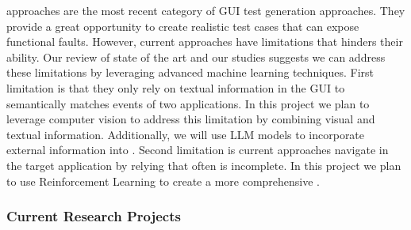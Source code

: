 
\bigskip
\testreuse approaches are the most recent category of GUI test generation approaches. 
They provide a great opportunity to create realistic test cases that can expose functional faults.
However, current approaches have limitations that hinders their ability. 
Our review of state of the art and our studies suggests we can address these limitations by leveraging advanced machine learning techniques.
First limitation is that they only rely on textual information in the GUI to semantically matches events of two applications. 
In this project we plan to leverage computer vision to address this limitation by combining visual and textual information.
Additionally, we will use LLM models to incorporate external information into \testreuse. 
Second limitation is current approaches navigate in the target application by relying \tam that often is incomplete. 
In this project we plan to use Reinforcement Learning to create a more comprehensive \tam.



\subsubsection{Current Research Projects}





